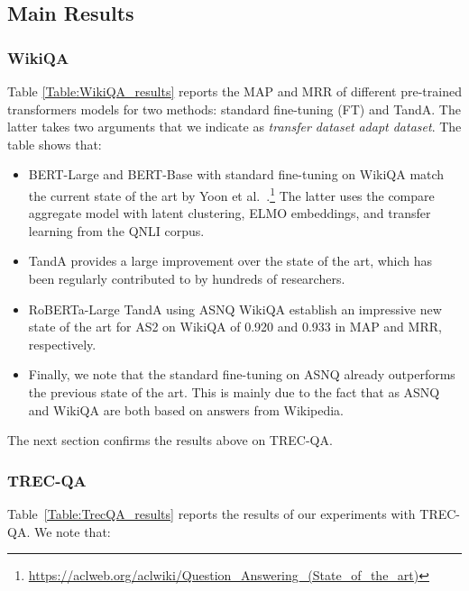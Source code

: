 \documentclass[letterpaper]{article} \usepackage{aaai20}  \usepackage{times}  \usepackage{helvet} \usepackage{courier}  \usepackage[hyphens]{url}  \usepackage{graphicx} \urlstyle{rm} \def\UrlFont{\rm}  \usepackage{graphicx}  \usepackage{todonotes}
\newcommand{\TANDA}{T{\sc and}A}
\begin{document}
\subsection{Main Results}

\subsubsection{WikiQA}

Table \ref{Table:WikiQA_results} reports the MAP and MRR of different pre-trained transformers models for two methods: standard fine-tuning (FT) and {\TANDA}. The latter takes two arguments that we indicate as \textit{transfer dataset}  \textit{adapt dataset}.  The table shows that:
\begin{itemize}
\item BERT-Large and BERT-Base with standard fine-tuning on WikiQA match the current state of the art by Yoon et al.~.\footnote{\url{https://aclweb.org/aclwiki/Question_Answering_(State_of_the_art)}} 
The latter uses the compare aggregate model with latent clustering, ELMO embeddings, and transfer learning from the QNLI corpus.
\item  {\TANDA} provides a large improvement over the state of the art, which has been regularly contributed to by hundreds of researchers.
\item RoBERTa-Large {\TANDA} using ASNQ  WikiQA establish an impressive new state of the art for AS2 on \mbox{WikiQA} of 0.920 and 0.933 in MAP and MRR, respectively. 
\item Finally, we note that the standard fine-tuning on ASNQ already outperforms the previous state of the art. This is mainly due to the fact that as ASNQ and WikiQA are both based on answers from Wikipedia.
\end{itemize}
The next section confirms the results above on TREC-QA.





\subsubsection{TREC-QA}
Table~\ref{Table:TrecQA_results} reports the results of our experiments with TREC-QA. We note that:
\end{document}
